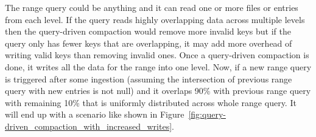 The range query could be anything and it can read one or more files or entries from each level. If the query reads highly
overlapping data across multiple levels then the query-driven compaction would remove more invalid keys but if the query only 
has fewer keys that are overlapping, it may add more overhead of writing valid keys than removing invalid ones. 
Once a query-driven compaction is done, it writes all the data for the range into one level. Now, if a new range query is 
triggered after some ingestion (assuming the intersection of previous range query with new entries is not 
null) and it overlaps 90\% with previous range query with remaining 10\% that is uniformly 
distributed across whole range query. It will end up with a scenario like shown in Figure~\ref{fig:query-driven_compaction_with_increased_writes}. 



\begin{table}
    \caption{Decision making data per level for each range query}
    \label{table:decision-making-meta-data}
\end{table}

